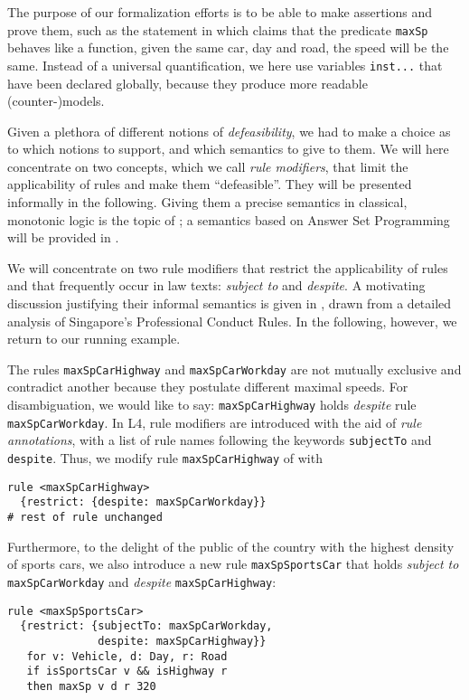 The purpose of our formalization efforts is to be able to make assertions
and prove them, such as the statement in  which claims
that the predicate 
\texttt{maxSp} behaves like a function, \ie{} given the same car, day and
road, the speed will be the same. Instead of a universal quantification, we
here use variables \texttt{inst...} that have been declared globally, because they
produce more readable (counter-)models. 

Given a plethora of different notions of \emph{defeasibility}, we had to make a
choice as to which notions to support, and which semantics to give to them. We
will here concentrate on two concepts, which we call \emph{rule modifiers},
that limit the applicability of rules and make them ``defeasible''. They will
be presented informally in the following. Giving them a precise semantics in
classical, monotonic logic is the topic of ;
a semantics based on Answer Set Programming will be provided in
.

We will concentrate on two rule modifiers that restrict the applicability of
rules and that frequently occur in law texts: \emph{subject to} and
\emph{despite}. A motivating discussion justifying their informal semantics is
given in , drawn from a detailed
analysis of Singapore's Professional Conduct Rules. In the following, however,
we return to our running example.

\begin{example}
  The rules \texttt{maxSpCarHighway} and \texttt{maxSpCarWorkday} are not
  mutually exclusive and contradict another because they postulate different
  maximal speeds. For disambiguation, we would like to say:
  \texttt{maxSpCarHighway} holds \emph{despite} rule
  \texttt{maxSpCarWorkday}. In L4, rule modifiers are introduced with the aid
  of \emph{rule annotations}, with a list of rule names following the keywords
  \texttt{subjectTo} and \texttt{despite}. Thus, we modify rule
  \texttt{maxSpCarHighway} of  with
\begin{lstlisting}
rule <maxSpCarHighway>
  {restrict: {despite: maxSpCarWorkday}}
# rest of rule unchanged
\end{lstlisting}
Furthermore, to the delight of the public of the country with the highest
density of sports cars, we also introduce a new rule \texttt{maxSpSportsCar}
that holds \emph{subject to} \texttt{maxSpCarWorkday} and \emph{despite}
\texttt{maxSpCarHighway}:
\begin{lstlisting}
rule <maxSpSportsCar>
  {restrict: {subjectTo: maxSpCarWorkday, 
              despite: maxSpCarHighway}}
   for v: Vehicle, d: Day, r: Road
   if isSportsCar v && isHighway r
   then maxSp v d r 320
 \end{lstlisting}
\end{example}

